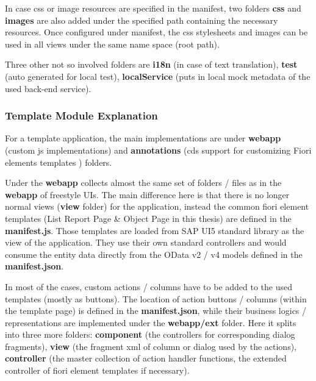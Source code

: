 In case css or image resources are specified in the manifest, two folders \textbf{css} and \textbf{images} are also added under the specified path containing the necessary resources. Once configured under manifest, the css stylesheets and images can be used in all views under the same name space (root path).

Three other not so involved folders are \textbf{i18n} (in case of text translation), \textbf{test} (auto generated for local test), \textbf{localService} (puts in local mock metadata of the used back-end service).

\subsubsection{Template Module Explanation}

For a template application, the main implementations are under \textbf{webapp} (custom js implementations) and \textbf{annotations} (cds support for customizing Fiori elements templates \cite{fiori-showcase}\cite{fiori-design}\cite{fiori-toolkit}) folders.

Under the \textbf{webapp} collects almost the same set of folders / files as in the \textbf{webapp} of freestyle UIs. The main difference here is that there is no longer normal views (\textbf{view} folder) for the application, instead the common fiori element templates (List Report Page \& Object Page in this thesis) are defined in the \textbf{manifest.js}. Those templates are loaded from SAP UI5 standard library as the view of the application. They use their own standard controllers and would consume the entity data directly from the OData v2 / v4 models defined in the \textbf{manifest.json}. 


In most of the cases, custom actions / columns have to be added to the used templates (mostly as buttons). The location of action buttons / columns (within the template page) is defined in the \textbf{manifest.json}, while their business logics / representations are implemented under the \textbf{webapp/ext} folder. Here it splits into three more folders: \textbf{component} (the controllers for corresponding dialog fragments), \textbf{view} (the fragment xml of column or dialog used by the actions), \textbf{controller} (the master collection of action handler functions, the extended controller of fiori element templates if necessary).

